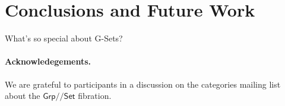 \documentclass[a4paper,UKenglish]{lipics}
\newcommand{\SystemF}{System F\xspace}
\newcommand{\ra}{\rightarrow}
\newcommand{\msf}[1]{\mathsf{#1}} %
\newcommand{\Grp}{\msf{Grp}}
\newcommand{\Set}{\msf{Set}}
\newcommand{\GroupSet}[1]{#1/\!/\Set}
\newcommand{\GrpSet}{\GroupSet{\Grp}}
\newcommand{\sem}[1]{\ensuremath{\llbracket #1 \rrbracket} \;}
\begin{document}
\section{Conclusions and Future Work} \label{sec:con}
What's so special about G-Sets?

\paragraph*{Acknowledegements.}
We are grateful to participants in a discussion on the categories mailing list
about the $\GrpSet$ fibration.


\end{document}
